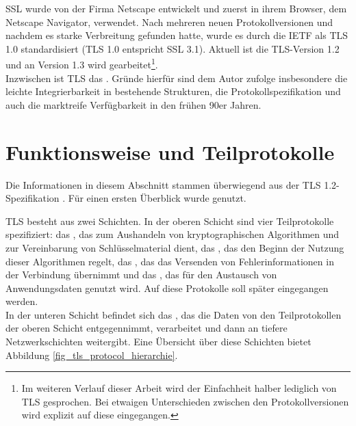 SSL wurde von der Firma Netscape entwickelt und zuerst in ihrem Browser, dem Netscape Navigator, verwendet. Nach mehreren neuen Protokollversionen und nachdem es starke Verbreitung gefunden hatte, wurde es durch die IETF als TLS 1.0 standardisiert (TLS 1.0 entspricht SSL 3.1). Aktuell ist die TLS-Version 1.2 und an Version 1.3 wird gearbeitet\footnote{
	Im weiteren Verlauf dieser Arbeit wird der Einfachheit halber lediglich von TLS gesprochen. Bei etwaigen Unterschieden zwischen den Protokollversionen wird explizit auf diese eingegangen.
}.\\
Inzwischen ist TLS das \cite{schmeh09}. Gründe hierfür sind dem Autor zufolge insbesondere die leichte Integrierbarkeit in bestehende Strukturen, die  Protokollspezifikation und auch die marktreife Verfügbarkeit in den frühen 90er Jahren.

\section{Funktionsweise und Teilprotokolle}

Die Informationen in diesem Abschnitt stammen überwiegend aus der TLS 1.2-Spezifikation \cite{tls12}. Für einen ersten Überblick wurde \cite{eckert13} genutzt.

TLS besteht aus zwei Schichten. In der oberen Schicht sind vier Teilprotokolle spezifiziert: das \handshakeprotocol{}, das zum Aushandeln von kryptographischen Algorithmen und zur Vereinbarung von Schlüsselmaterial dient, das \changecipherspecprotocol{}, das den Beginn der Nutzung dieser Algorithmen regelt, das \alertprotocol{}, das das Versenden von Fehlerinformationen in der Verbindung übernimmt und das \applicationdataprotocol{}, das für den Austausch von Anwendungsdaten genutzt wird. Auf diese Protokolle soll später eingegangen werden.\\ 
In der unteren Schicht befindet sich das \recordprotocol{}, das die Daten von den Teilprotokollen der oberen Schicht entgegennimmt, verarbeitet und dann an tiefere Netzwerkschichten weitergibt. Eine Übersicht über diese Schichten bietet Abbildung \ref{fig_tls_protocol_hierarchie}.

